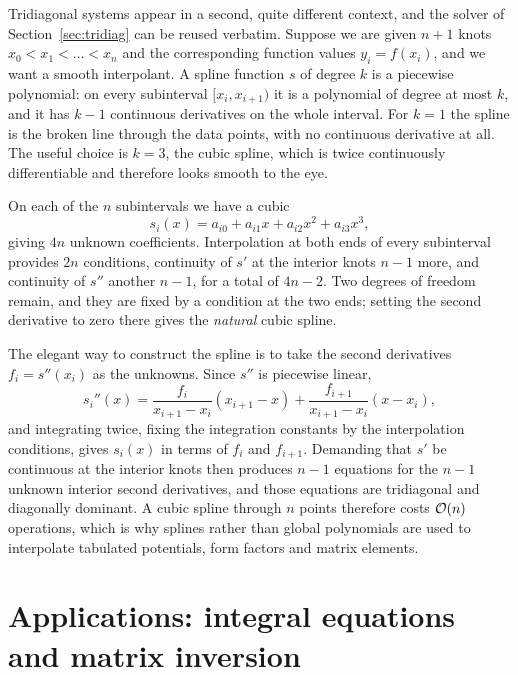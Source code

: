 Tridiagonal systems appear in a second, quite different context, and the
solver of Section~\ref{sec:tridiag} can be reused verbatim.  Suppose we are
given $n+1$ knots $x_0<x_1<\dots<x_n$ and the corresponding function values
$y_i=f(x_i)$, and we want a smooth interpolant.  A spline function $s$ of
degree $k$ is a piecewise polynomial: on every subinterval $[x_{i},x_{i+1})$
it is a polynomial of degree at most $k$, and it has $k-1$ continuous
derivatives on the whole interval.  For $k=1$ the spline is the broken line
through the data points, with no continuous derivative at all.  The useful
choice is $k=3$, the cubic spline, which is twice continuously differentiable
and therefore looks smooth to the eye.

On each of the $n$ subintervals we have a cubic
\begin{equation}
  s_i(x) = a_{i0}+a_{i1}x+a_{i2}x^2+a_{i3}x^3 ,
  \label{eq:1-splinepoly}
\end{equation}
giving $4n$ unknown coefficients.  Interpolation at both ends of every
subinterval provides $2n$ conditions, continuity of $s'$ at the interior knots
$n-1$ more, and continuity of $s''$ another $n-1$, for a total of $4n-2$.  Two
degrees of freedom remain, and they are fixed by a condition at the two ends;
setting the second derivative to zero there gives the \emph{natural} cubic
spline.

The elegant way to construct the spline is to take the second derivatives
$f_i=s''(x_i)$ as the unknowns.  Since $s''$ is piecewise linear,
\begin{equation}
  s_i''(x) = \frac{f_i}{x_{i+1}-x_i}(x_{i+1}-x)
           + \frac{f_{i+1}}{x_{i+1}-x_i}(x-x_i),
  \label{eq:1-splinesecond}
\end{equation}
and integrating twice, fixing the integration constants by the interpolation
conditions, gives $s_i(x)$ in terms of $f_i$ and $f_{i+1}$.  Demanding that
$s'$ be continuous at the interior knots then produces $n-1$ equations for the
$n-1$ unknown interior second derivatives, and those equations are
tridiagonal and diagonally dominant.  A cubic spline through $n$ points
therefore costs $\mathcal{O}(n)$ operations, which is why splines rather than global
polynomials are used to interpolate tabulated potentials, form factors and
matrix elements.

\section{Applications: integral equations and matrix inversion}
\label{sec:applications}

